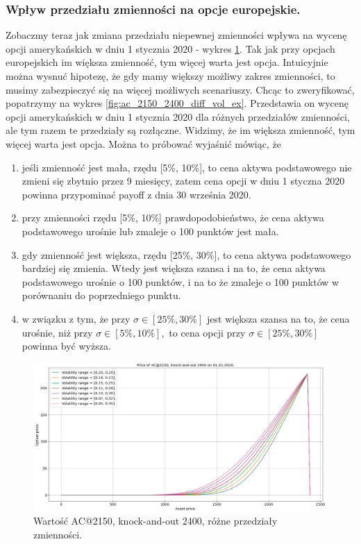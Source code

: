 \documentclass[12pt]{article}
\begin{document}
\subsubsection{Wpływ przedziału zmienności na opcje europejskie.}

Zobaczmy teraz jak zmiana przedziału niepewnej zmienności wpływa na wycenę opcji amerykańskich w dniu 1 stycznia 2020 - wykres \ref{fig:ac_2150_2400_diff_vol_range}. Tak jak przy opcjach europejskich im większa zmienność, tym więcej warta jest opcja. Intuicyjnie można wysnuć hipotezę, że gdy mamy większy możliwy zakres zmienności, to musimy zabezpieczyć się na więcej możliwych scenariuszy. Chcąc to zweryfikować, popatrzymy na wykres \ref{fig:ac_2150_2400_diff_vol_ex}. Przedstawia on wycenę opcji amerykańskich w dniu 1 stycznia 2020 dla różnych przedziałów zmienności, ale tym razem te przedziały są rozłączne. Widzimy, że im większa zmienność, tym więcej warta jest opcja. Można to próbować wyjaśnić mówiąc, że 
\begin{enumerate}
    \item jeśli zmienność jest mała, rzędu [5\%, 10\%], to cena aktywa podstawowego nie zmieni się zbytnio przez 9 miesięcy, zatem cena opcji w dniu 1 styczna 2020 powinna przypominać payoff z dnia 30 września 2020.  
    \item przy zmienności rzędu [5\%, 10\%] prawdopodobieństwo, że cena aktywa podstawowego urośnie lub zmaleje o 100 punktów jest mała. 
    \item gdy zmienność jest większa, rzędu [25\%, 30\%], to cena aktywa podstawowego bardziej się zmienia.  Wtedy jest większa szansa i na to, że cena aktywa podstawowego urośnie o 100 punktów, i na to że zmaleje o 100 punktów w porównaniu do poprzedniego punktu.  
    \item w związku z tym, że przy $\sigma \in [25\%, 30\%]$ jest większa szansa na to, że cena urośnie, niż przy $\sigma \in [5\%, 10\%],$ to cena opcji przy $\sigma \in [25\%, 30\%]$ powinna być wyższa. 
\end{enumerate}


\begin{figure}[H]
    \centering
    \includegraphics[width=\textwidth,height=\textheight,keepaspectratio]{ac_2150_2400_diff_vol_range.png}
    \caption{Wartość AC@2150, knock-and-out 2400, różne przedziały zmienności.}
    \label{fig:ac_2150_2400_diff_vol_range}
\end{figure}
\end{document}
